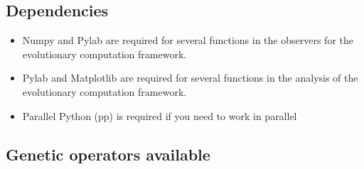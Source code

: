 \documentclass{article}
\begin{document}
	\subsection{Dependencies}
	\begin{itemize}
		\item Numpy and Pylab are required for several functions in the observers for the evolutionary computation framework.
		\item Pylab and Matplotlib are required for several functions in the analysis of the evolutionary computation framework.
		\item Parallel Python (pp) is required if you need to work in parallel
	\end{itemize}
	\subsection{Genetic operators available}
\end{document}
